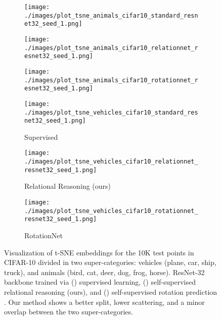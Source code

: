 \documentclass{article}
\begin{document}
\begin{figure}[H]
    \begin{subfigure}[t]{0.333\textwidth}
        \centering
        \texttt{[image: ./images/plot\_tsne\_animals\_cifar10\_standard\_resnet32\_seed\_1.png]}
    \end{subfigure}
    \begin{subfigure}[t]{0.333\textwidth}
       \centering
        \texttt{[image: ./images/plot\_tsne\_animals\_cifar10\_relationnet\_resnet32\_seed\_1.png]}
    \end{subfigure}
    \begin{subfigure}[t]{0.333\textwidth}
       \centering
        \texttt{[image: ./images/plot\_tsne\_animals\_cifar10\_rotationnet\_resnet32\_seed\_1.png]}
    \end{subfigure}
    \begin{subfigure}[t]{0.333\textwidth}
        \centering
        \texttt{[image: ./images/plot\_tsne\_vehicles\_cifar10\_standard\_resnet32\_seed\_1.png]}
        \caption{Supervised}
        \label{fig:tsne-va-supervised}
    \end{subfigure}
    \begin{subfigure}[t]{0.333\textwidth}
        \centering
        \texttt{[image: ./images/plot\_tsne\_vehicles\_cifar10\_relationnet\_resnet32\_seed\_1.png]}
        \caption{Relational Reasoning (ours)}
        \label{fig:tsne-va-relationat}
    \end{subfigure}\begin{subfigure}[t]{0.333\textwidth}
        \centering
        \texttt{[image: ./images/plot\_tsne\_vehicles\_cifar10\_rotationnet\_resnet32\_seed\_1.png]}
        \caption{RotationNet}
        \label{fig:tsne-va-rotation}
    \end{subfigure}    
    \caption{Visualization of t-SNE embeddings for the 10K test points in CIFAR-10 divided in two super-categories: vehicles (plane, car, ship, truck), and animals (bird, cat, deer, dog, frog, horse). ResNet-32 backbone trained via () supervised learning, () self-supervised relational reasoning (ours), and () self-supervised rotation prediction \citep{gidaris2018unsupervised}. Our method shows a better split, lower scattering, and a minor overlap between the two super-categories.}
    \label{fig:tsne-va}
\end{figure}
\end{document}
